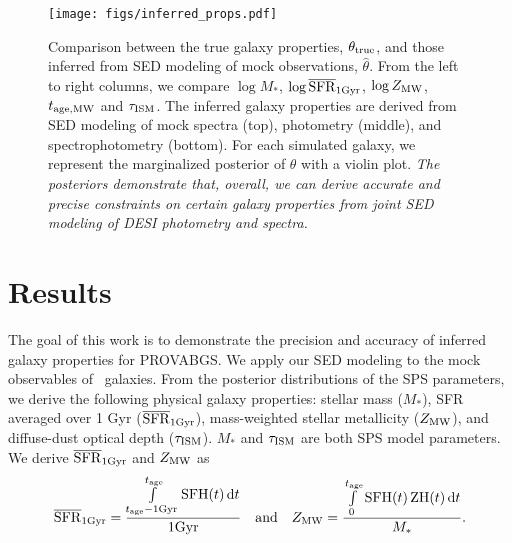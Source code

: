\begin{figure}
\begin{center}
\texttt{[image: figs/inferred\_props.pdf]}
\caption{
    Comparison between the true galaxy properties, $\theta_{\rm true}$, and
    those inferred from SED modeling of mock observations, $\hat{\theta}$. 
    From the left to right columns, we compare $\log M_*$, $\log \overline{\rm SFR}_{\rm 1Gyr}$, 
    $\log Z_{\rm MW}$, $t_{\rm age, MW}$ and $\tau_{\rm ISM}$. 
    The inferred galaxy properties are derived from SED modeling of mock
    spectra (top), photometry (middle), and spectrophotometry (bottom). 
    For each simulated galaxy, we represent the marginalized posterior of
    $\theta$ with a violin plot.  %
    \emph{The posteriors demonstrate that, overall, we can derive accurate and 
    precise constraints on certain galaxy properties from joint SED modeling of
    DESI photometry and spectra.}
    } \label{fig:prop_inf}
\end{center}
\end{figure}

\section{Results} \label{sec:results}
The goal of this work is to demonstrate the precision and accuracy of inferred
galaxy properties for PROVABGS. 
We apply our SED modeling to the mock observables of  \lgal~galaxies.
From the posterior distributions of the SPS parameters, we derive the following
physical galaxy properties: stellar mass ($M_*$), SFR averaged over 1 Gyr
($\overline{\rm SFR}_{\rm 1Gyr}$), mass-weighted stellar metallicity ($Z_{\rm MW}$), and diffuse-dust
optical depth ($\tau_{\rm ISM}$).
$M_*$ and $\tau_{\rm ISM}$ are both SPS model parameters. 
We derive $\overline{\rm SFR}_{\rm 1Gyr}$ and $Z_{\rm MW}$ as 
\begin{equation} \label{eq:prop_eqs}
    \avgsfr = \frac{\int\limits_{t_{\rm age} - {\rm 1 Gyr}}^{t_{\rm age}}{\rm
    SFH}(t)\,{\rm d}t}{{\rm 1 Gyr}} \quad{\rm and}\quad
    Z_{\rm MW} = \frac{\int\limits_0^{t_{\rm age}}{\rm SFH}(t)\,{\rm
    ZH}(t)\,{\rm d}t}{M_*}.
\end{equation} 

